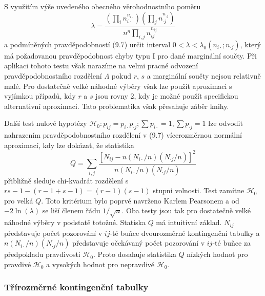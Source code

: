 S využitím výše uvedeného obecného věrohodnostního poměru
\begin{equation*}
\lambda = \frac{\left(\prod_i n_{i \cdot}^{n_{i \cdot}}\right)\left(\prod_j n_{\cdot j}^{n_{\cdot j}}\right)}{n^n \prod_{i,j}n_{ij}^{n_{ij}}}
\end{equation*}
a podmíněných pravděpodobností (9.7) určit interval $0 < \lambda < \lambda_0(n_{i \cdot}; n_{\cdot j})$, který má požadovanou pravděpodobnost chyby typu I pro dané marginální součty. Při aplikaci tohoto testu však narazíme na velmi pracné odvození pravděpodobnostního rozdělení $\Lambda$ pokud $r$, $s$ a marginální součty nejsou relativně malé. Pro dostatečně velké náhodné výběry však lze použít aproximaci s vyjímkou případů, kdy $r$ a $s$ jsou rovny 2, kdy je možné použít specifickou alternativní aproximaci. Tato problematika však přesahuje záběr knihy.

Další test nulové hypotézy $\mathscr{H}_0: p_{ij} = p_{i \cdot} p_{\cdot j}; \sum p_{i \cdot} = 1, \sum p_{\cdot j} = 1$ lze odvodit nahrazením pravděpodobnostního rozdělení v (9.7) vícerozměrnou normální aproximací, kdy lze dokázat, že statistika
\begin{equation*}
Q = \sum_{i,j}\frac{[N_{ij} - n(N_{i \cdot}/n)(N_{\cdot j}/n)]^2}{n(N_{i \cdot}/n)(N_{\cdot j}/n)}
\end{equation*}
přibližně sleduje chi-kvadrát rozdělení s $rs - 1 - (r - 1 + s - 1) = (r - 1)(s - 1)$ stupni volnosti. Test zamítne $\mathscr{H}_0$ pro velká $Q$. Toto kritérium bylo poprvé navrženo Karlem Pearsonem a od $-2 \ln(\lambda)$ se liší členem řádu $1/\sqrt{n}$. Oba testy jsou tak pro dostatečně velké náhodné výběry v podstatě totožné. Statiska $Q$ má intuitivní základ. $N_{ij}$ představuje počet pozorování v $ij$-té buňce dvourozměrné kontingenční tabulky a $n(N_{i \cdot}/n)(N_{\cdot j}/n)$ představuje očekávaný počet pozorování v $ij$-té buňce za předpokladu pravdivosti $\mathscr{H}_0$. Proto dosahuje statistika $Q$ nízkých hodnot pro pravdivé $\mathscr{H}_0$ a vysokých hodnot pro nepravdivé $\mathscr{H}_0$.

\subsubsection{Třírozměrné kontingenční tabulky}

